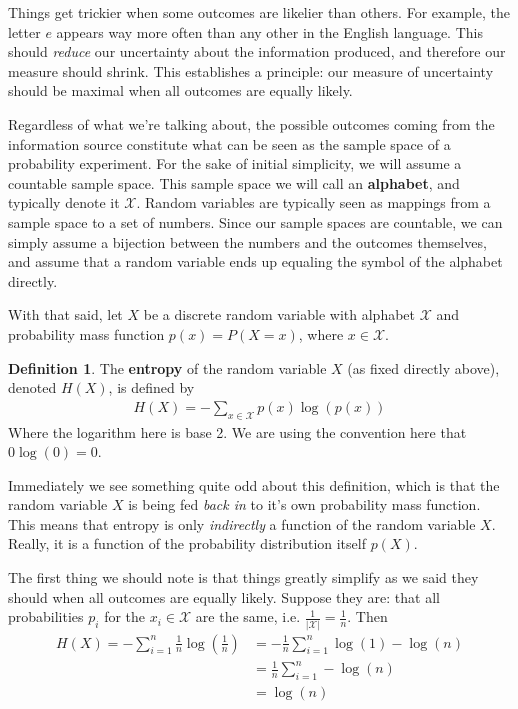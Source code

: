 \documentclass{article}
\theoremstyle{definition}
\newtheorem{definition}{Definition}[section]
\theoremstyle{plain}
\begin{document}
Things get trickier when some outcomes are likelier than others. For example, the letter $e$ appears way more often than any other in the English language. This should \emph{reduce} our uncertainty about the information produced, and therefore our measure should shrink. This establishes a principle: our measure of uncertainty should be maximal when all outcomes are equally likely. \par  Regardless of what we're talking about, the possible outcomes coming from the information source constitute what can be seen as the sample space of a probability experiment. For the sake of initial simplicity, we will assume a countable sample space. This sample space we will call an \textbf{alphabet}, and typically denote it $\mathcal{X}$. Random variables are typically seen as mappings from a sample space to a set of numbers. Since our sample spaces are countable, we can simply assume a bijection between the numbers and the outcomes themselves, and assume that a random variable ends up equaling the symbol of the alphabet directly. \par 
With that said, let $X$ be a discrete random variable with alphabet $\mathcal{X}$ and probability mass function $p(x)=P(X = x)$, where $x \in \mathcal{X}$. 
\begin{definition}
	The \textbf{entropy} of the random variable $X$ (as fixed directly above), denoted $H(X)$, is defined by
	\begin{align}
		H(X) = -\sum_{x \in \mathcal{X}}p(x)\log(p(x))
	\end{align}
Where the logarithm here is base 2. We are using the convention here that $0\log(0) = 0$.  
\end{definition}
Immediately we see something quite odd about this definition, which is that the random variable $X$ is being fed \emph{back in} to it's own probability mass function. This means that entropy is only \emph{indirectly} a function of the random variable $X$. Really, it is a function of the probability distribution itself $p(X)$. \par 
The first thing we should note is that things greatly simplify as we said they should when all outcomes are equally likely. Suppose they are: that all probabilities $p_i$ for the $x_i \in \mathcal{X}$ are the same, i.e. $\frac{1}{|\mathcal{X}|} = \frac{1}{n}$. Then 
\begin{align*}
	H(X) = -\sum_{i=1}^n \frac{1}{n}\log(\frac{1}{n}) &= -\frac{1}{n}\sum_{i=1}^n \log(1)-\log(n) \\
		&= \frac{1}{n} \sum_{i=1}^n -\log(n) \\
		&= \log(n)
\end{align*}
\end{document}
